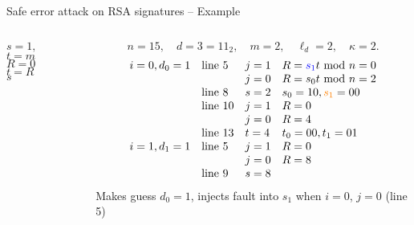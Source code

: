 \begin{frame}{Safe error attack on RSA signatures -- Example}
\begin{columns}[T] %
\begin{column}{.45\textwidth}
{\small
{
\setlength{\interspacetitleruled}{0pt}%
\setlength{\algotitleheightrule}{0pt}%
    \begin{algorithm}[H]
$s= 1,\quad$
$t = m$\\
 	{
            $R=0$\\
            $t=R$\\
  	}
  	\Return $s$\\
\end{algorithm}}}
\end{column}%
\hfill%
\begin{column}{.58\textwidth}
\begin{example}
\[
n=15,\quad d=3=11_2,\quad m=2,\quad \ell_d=2,\quad \kappa=2.
\]
\[
\begin{array}{llll}
i=0,d_0=1 & \text{line 5}  & j=1 & R=\textcolor{blue}{s_1}t\textrm{~mod~} n=0\\
   &  & j=0 & R=s_0t\textrm{~mod~} n=2\\
   & \text{line 8}  & s=2 & s_0=10, \textcolor{orange}{s_1}=00\\
  &  \text{line 10} & j=1 & R=0\\
   & & j=0 & R=4\\
   &\text{line 13} & t=4 & t_{0}=00, t_{1}=01\\
i=1,d_1=1 & \text{line 5} & j=1 & R=0\\
& & j=0 & R=8\\
& \text{line 9} & s=8
\end{array}
\]
Makes guess $d_0=1$, injects fault into $s_1$ when $i=0$, $j=0$ (line 5)
\end{example}
\end{column}%
\end{columns}
\end{frame}

